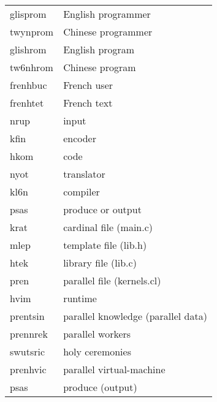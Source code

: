 \begin{figure}
\begin{tabular}{ll}
  glisprom & English programmer \\
  twynprom & Chinese programmer \\
  glishrom & English program \\
  tw6nhrom & Chinese program \\
  frenhbuc & French user \\
  frenhtet & French text \\
  nrup & input \\
  kfin & encoder \\
  hkom & code \\
  nyot & translator \\
  kl6n & compiler \\
  psas & produce or output \\
  krat & cardinal file (main.c) \\
  mlep & template file (lib.h) \\
  htek & library file (lib.c) \\
  pren & parallel file (kernels.cl) \\
  hvim & runtime \\
  prentsin & parallel knowledge (parallel data) \\
  prennrek & parallel workers \\
  swutsric & holy ceremonies \\
  prenhvic & parallel virtual-machine \\
  psas & produce  (output) \\
\end{tabular}
\end{figure}
